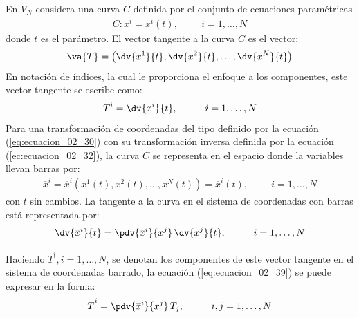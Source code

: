 En $V_{N}$ considera una curva $C$ definida por el conjunto de ecuaciones paramétricas
\begin{align*}
C: x^{i} = x^{i} (t), \hspace{1cm} i = 1, \ldots, N
\end{align*}
donde $t$ es el parámetro. El vector tangente a la curva $C$ es el vector:
\begin{align*}
\va{T} = \left( \dv{x^{1}}{t}, \dv{x^{2}}{t}, \ldots, \dv{x^{N}}{t} \right)
\end{align*}
En notación de índices, la cual le proporciona el enfoque a los componentes, este vector tangente se escribe como:
\begin{align*}
T^{i} = \dv{x^{i}}{t}, \hspace{1cm} i = 1, \ldots, N
\end{align*}
Para una transformación de coordenadas del tipo definido por la ecuación (\ref{eq:ecuacion_02_30}) con su transformación inversa definida por la ecuación (\ref{ec:ecuacion_02_32}), la curva $C$ se representa en el espacio donde la variables llevan barras por:
\begin{align*}
\overline{x}^{i} = \overline{x}^{i} (x^{1} (t), x^{2} (t), \ldots, x^{N} (t)) = \overline{x}^{i} (t), \hspace{1cm} i = 1, \ldots, N
\end{align*}
con $t$ sin cambios. La tangente a la curva en el sistema de coordenadas con barras está representada por:
\begin{align}
\dv{\overline{x}^{i}}{t} = \pdv{\overline{x}^{i}}{x^{j}} \, \dv{x^{j}}{t}, \hspace{1cm} i = 1, \ldots, N
\label{eq:ecuacion_02_39}
\end{align}

Haciendo $\overline{T}^{i}, i = 1, \ldots, N$, se denotan los componentes de este vector tangente en el sistema de coordenadas barrado, la ecuación (\ref{eq:ecuacion_02_39}) se puede expresar en la forma:
\begin{align}
\overline{T}^{i} = \pdv{\overline{x}^{i}}{x^{j}} \, T_{j}, \hspace{1cm} i, j = 1, \ldots, N
\label{eq:ecuacion_02_40} 
\end{align}

